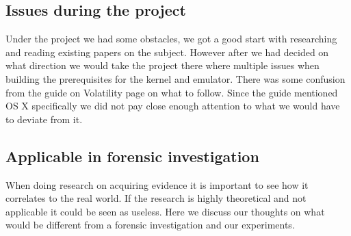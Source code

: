 \subsection{Issues during the project}
Under the project we had some obstacles, we got a good start with researching and 
reading existing papers on the subject. However after we had decided on what 
direction we would take the project there where multiple issues when building the 
prerequisites for the kernel and emulator. There was some confusion from the guide 
on Volatility page on what to follow. Since the guide mentioned OS X specifically 
we did not pay close enough attention to what we would have to deviate from it.


\subsection{Applicable in forensic investigation}
When doing research on acquiring evidence it is important to see how it correlates 
to the real world. If the research is highly theoretical and not applicable it 
could be seen as useless. Here we discuss our thoughts on what would be different 
from a forensic investigation and our experiments.